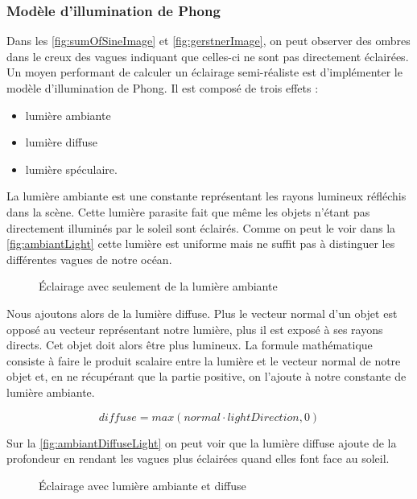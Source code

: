 \pagebreak

\subsubsection{Modèle d'illumination de Phong}

Dans les \autoref{fig:sumOfSineImage} et \autoref{fig:gerstnerImage}, on peut observer des ombres dans le creux des vagues indiquant que celles-ci ne sont pas directement éclairées. Un moyen performant de calculer un éclairage semi-réaliste est d'implémenter le modèle d'illumination de Phong. Il est composé de trois effets :

\begin{itemize}
	\item lumière ambiante
	\item lumière diffuse
	\item lumière spéculaire.
\end{itemize}

La lumière ambiante est une constante représentant les rayons lumineux réfléchis dans la scène. Cette lumière parasite fait que même les objets n'étant pas directement illuminés par le soleil sont éclairés. Comme on peut le voir dans la \autoref{fig:ambiantLight} cette lumière est uniforme mais ne suffit pas à distinguer les différentes vagues de notre océan.

\begin{figure}[H]			
	\caption{Éclairage avec seulement de la lumière ambiante}
	\label{fig:ambiantLight}
\end{figure}

Nous ajoutons alors de la lumière diffuse. Plus le vecteur normal d'un objet est opposé au vecteur représentant notre lumière, plus il est exposé à ses rayons directs. Cet objet doit alors être plus lumineux. La formule mathématique consiste à faire le produit scalaire entre la lumière et le vecteur normal de notre objet et, en ne récupérant que la partie positive, on l'ajoute à notre constante de lumière ambiante.

\[diffuse = max(normal \cdot lightDirection,0)\]

Sur la \autoref{fig:ambiantDiffuseLight} on peut voir que la lumière diffuse ajoute de la profondeur en rendant les vagues plus éclairées quand elles font face au soleil.

\begin{figure}[H]			
	\caption{Éclairage avec lumière ambiante et diffuse}
	\label{fig:ambiantDiffuseLight}
\end{figure}

